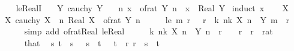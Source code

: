 \begin{isabellebody}
\ \ \isamarkupfalse%
%
\endisatagproof
{\isafoldproof}%
%
\isadelimproof
\isanewline
%
\endisadelimproof
\isanewline
{}\isamarkupfalse%
\ le{\isacharunderscore}{\kern0pt}RealI{\isacharcolon}{\kern0pt}\isanewline
\ \ \ Y{\isacharcolon}{\kern0pt}\ {\isachardoublequoteopen}cauchy\ Y{\isachardoublequoteclose}\isanewline
\ \ \ {\isachardoublequoteopen}{\isasymforall}n{\isachardot}{\kern0pt}\ x\ {\isasymle}\ of{\isacharunderscore}{\kern0pt}rat\ {\isacharparenleft}{\kern0pt}Y\ n{\isacharparenright}{\kern0pt}\ {\isasymLongrightarrow}\ x\ {\isasymle}\ Real\ Y{\isachardoublequoteclose}\isanewline
%
\isadelimproof
%
\endisadelimproof
%
\isatagproof
{}\isamarkupfalse%
\ {\isacharparenleft}{\kern0pt}induct\ x{\isacharparenright}{\kern0pt}\isanewline
\ \ \isamarkupfalse%
\ X\isanewline
\ \ \isamarkupfalse%
\ X{\isacharcolon}{\kern0pt}\ {\isachardoublequoteopen}cauchy\ X{\isachardoublequoteclose}\ \ {\isachardoublequoteopen}{\isasymforall}n{\isachardot}{\kern0pt}\ Real\ X\ {\isasymle}\ of{\isacharunderscore}{\kern0pt}rat\ {\isacharparenleft}{\kern0pt}Y\ n{\isacharparenright}{\kern0pt}{\isachardoublequoteclose}\isanewline
\ \ \isamarkupfalse%
\ \isamarkupfalse%
\ le{\isacharcolon}{\kern0pt}\ {\isachardoublequoteopen}{\isasymAnd}m\ r{\isachardot}{\kern0pt}\ {}\ {\isacharless}{\kern0pt}\ r\ {\isasymLongrightarrow}\ {\isasymexists}k{\isachardot}{\kern0pt}\ {\isasymforall}n{\isasymge}k{\isachardot}{\kern0pt}\ X\ n\ {\isasymle}\ Y\ m\ {\isacharplus}{\kern0pt}\ r{\isachardoublequoteclose}\isanewline
\ \ \ \ \isamarkupfalse%
\ {\isacharparenleft}{\kern0pt}simp\ add{\isacharcolon}{\kern0pt}\ of{\isacharunderscore}{\kern0pt}rat{\isacharunderscore}{\kern0pt}Real\ le{\isacharunderscore}{\kern0pt}Real{\isacharparenright}{\kern0pt}\isanewline
\ \ \isamarkupfalse%
\ \isamarkupfalse%
\ {\isachardoublequoteopen}{\isasymexists}k{\isachardot}{\kern0pt}\ {\isasymforall}n{\isasymge}k{\isachardot}{\kern0pt}\ X\ n\ {\isasymle}\ Y\ n\ {\isacharplus}{\kern0pt}\ r{\isachardoublequoteclose}\ \ {\isachardoublequoteopen}{}\ {\isacharless}{\kern0pt}\ r{\isachardoublequoteclose}\ \ r\ {\isacharcolon}{\kern0pt}{\isacharcolon}{\kern0pt}\ rat\isanewline
\ \ \isamarkupfalse%
\ {\isacharminus}{\kern0pt}\isanewline
\ \ \ \ \isamarkupfalse%
\ that\ \isamarkupfalse%
\ s\ t\ \ s{\isacharcolon}{\kern0pt}\ {\isachardoublequoteopen}{}\ {\isacharless}{\kern0pt}\ s{\isachardoublequoteclose}\ \ t{\isacharcolon}{\kern0pt}\ {\isachardoublequoteopen}{}\ {\isacharless}{\kern0pt}\ t{\isachardoublequoteclose}\ \ r{\isacharcolon}{\kern0pt}\ {\isachardoublequoteopen}r\ {\isacharequal}{\kern0pt}\ s\ {\isacharplus}{\kern0pt}\ t{\isachardoublequoteclose}\isanewline

\end{isabellebody}
